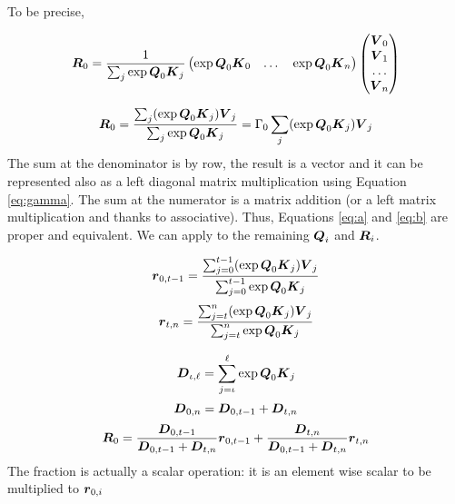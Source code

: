 \documentclass[conference]{IEEEtran}
\begin{document}
To be precise, 

\begin{equation}
  \label{eq:a}
  \Vc{R}_0 = \frac{1}{\sum_j\exp{\Vc{Q}_0\Vc{K}_j}}
  \begin{pmatrix}
    \exp{\Vc{Q}_0\Vc{K}_0} &  \dots &\exp{\Vc{Q}_0\Vc{K}_n} 
  \end{pmatrix}
  \begin{pmatrix}
    \Vc{V}_0  \\
    \Vc{V}_1  \\
    \dots \\
    \Vc{V}_n
  \end{pmatrix} 
\end{equation}

\begin{equation}
  \label{eq:b}
  \Vc{R}_0 = \frac{\sum_j(\exp{\Vc{Q}_0\Vc{K}_j})\Vc{V}_j}{\sum_j\exp{\Vc{Q}_0\Vc{K}_j}}=\Gamma_0\sum_j(\exp{\Vc{Q}_0\Vc{K}_j})\Vc{V}_j
\end{equation}
The sum at the denominator is by row, the result is a vector and it
can be represented also as a left diagonal matrix multiplication using
Equation \ref{eq:gamma}.  The sum at the numerator is a matrix
addition (or a left matrix multiplication and thanks to
associative). Thus, Equations \ref{eq:a} and \ref{eq:b} are proper and
equivalent. We can apply to the remaining ${\boldsymbol Q}_i$ and ${\boldsymbol R}_i$.


\begin{equation*}
  {\boldsymbol r}_{0,t-1} =
  \frac{\sum_{j=0}^{t-1}(\exp{{\boldsymbol Q}_0{\boldsymbol K}_j}){\boldsymbol V}_j}{\sum_{j=0}^{t-1}\exp{{\boldsymbol Q}_0{\boldsymbol K}_j}}
\end{equation*}
\begin{equation*}
  {\boldsymbol r}_{t,n} = \frac{\sum_{j=t}^{n}(\exp{{\boldsymbol Q}_0{\boldsymbol K}_j}){\boldsymbol V}_j}{\sum_{j=t}^n\exp{{\boldsymbol Q}_0{\boldsymbol K}_j}}
\end{equation*}

\begin{equation}
  {\boldsymbol D}_{\iota,\ell} = \sum_{j=\iota}^{\ell}\exp{{\boldsymbol Q}_0{\boldsymbol K}_j}
\end{equation}
\begin{equation}
  {\boldsymbol D}_{0,n} = {\boldsymbol D}_{0,t-1} + {\boldsymbol D}_{t,n}
\end{equation}
\begin{equation*}
  {\boldsymbol R}_0 = \frac{{\boldsymbol D}_{0,t-1}}{{\boldsymbol D}_{0,t-1} + {\boldsymbol D}_{t,n}}{\boldsymbol r}_{0,t-1}  +  \frac{{\boldsymbol D}_{t,n}}{{\boldsymbol D}_{0,t-1} + {\boldsymbol D}_{t,n}}{\boldsymbol r}_{t,n} 
\end{equation*}
The fraction is actually a scalar operation: it is an element wise
scalar to be multiplied to ${\boldsymbol r}_{0,i}$
\end{document}
